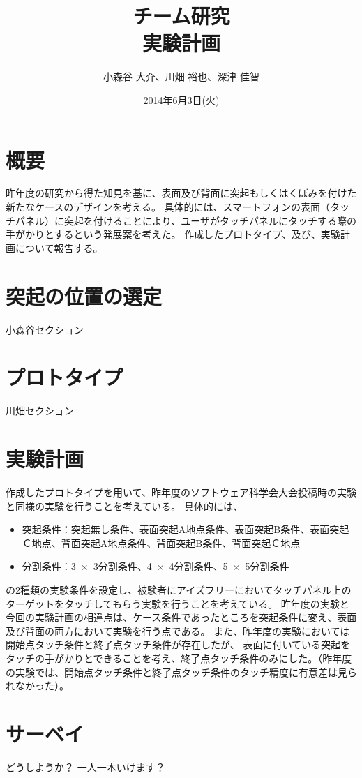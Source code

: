 \documentclass[11pt,a4paper]{jarticle}
\title{{チーム研究\\実験計画}}
\date{2014年6月3日(火)}
\author{小森谷 大介、川畑 裕也、深津 佳智}
\begin{document}
\maketitle

\section{概要}
昨年度の研究から得た知見を基に、表面及び背面に突起もしくはくぼみを付けた新たなケースのデザインを考える。
具体的には、スマートフォンの表面（タッチパネル）に突起を付けることにより、ユーザがタッチパネルにタッチする際の手がかりとするという発展案を考えた。
作成したプロトタイプ、及び、実験計画について報告する。

\section{突起の位置の選定}
小森谷セクション

\section{プロトタイプ}
川畑セクション

\section{実験計画}
作成したプロトタイプを用いて、昨年度のソフトウェア科学会大会投稿時の実験と同様の実験を行うことを考えている。
具体的には、
\begin{itemize}
	\item 突起条件：突起無し条件、表面突起A地点条件、表面突起B条件、表面突起Ｃ地点、背面突起A地点条件、背面突起B条件、背面突起Ｃ地点
	\item 分割条件：3~$\times$~3分割条件、4~$\times$~4分割条件、5~$\times$~5分割条件
\end{itemize}
の2種類の実験条件を設定し、被験者にアイズフリーにおいてタッチパネル上のターゲットをタッチしてもらう実験を行うことを考えている。
昨年度の実験と今回の実験計画の相違点は、ケース条件であったところを突起条件に変え、表面及び背面の両方において実験を行う点である。
また、昨年度の実験においては開始点タッチ条件と終了点タッチ条件が存在したが、
表面に付いている突起をタッチの手がかりとできることを考え、終了点タッチ条件のみにした。（昨年度の実験では、開始点タッチ条件と終了点タッチ条件のタッチ精度に有意差は見られなかった）。

\section{サーベイ}
どうしようか？
一人一本いけます？
\end{document}
